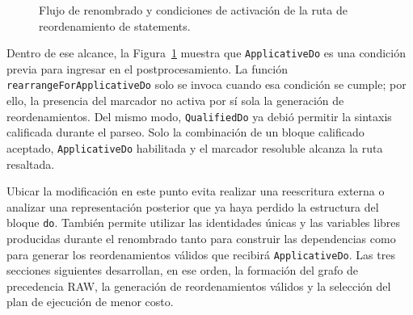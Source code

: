 \begin{figure}[ht]
\caption{Flujo de renombrado y condiciones de activación de la ruta de reordenamiento de statements.}
\label{fig:solucion-flujo-renamer}
\end{figure}

Dentro de ese alcance, la Figura~\ref{fig:solucion-flujo-renamer} muestra que \texttt{ApplicativeDo} es una condición previa para ingresar en el postprocesamiento. La función \texttt{rearrangeForApplicativeDo} solo se invoca cuando esa condición se cumple; por ello, la presencia del marcador no activa por sí sola la generación de reordenamientos. Del mismo modo, \texttt{QualifiedDo} ya debió permitir la sintaxis calificada durante el parseo. Solo la combinación de un bloque calificado aceptado, \texttt{ApplicativeDo} habilitada y el marcador resoluble alcanza la ruta resaltada.

Ubicar la modificación en este punto evita realizar una reescritura externa o analizar una representación posterior que ya haya perdido la estructura del bloque \texttt{do}. También permite utilizar las identidades únicas y las variables libres producidas durante el renombrado tanto para construir las dependencias como para generar los reordenamientos válidos que recibirá \texttt{ApplicativeDo}. Las tres secciones siguientes desarrollan, en ese orden, la formación del grafo de precedencia RAW, la generación de reordenamientos válidos y la selección del plan de ejecución de menor costo.
